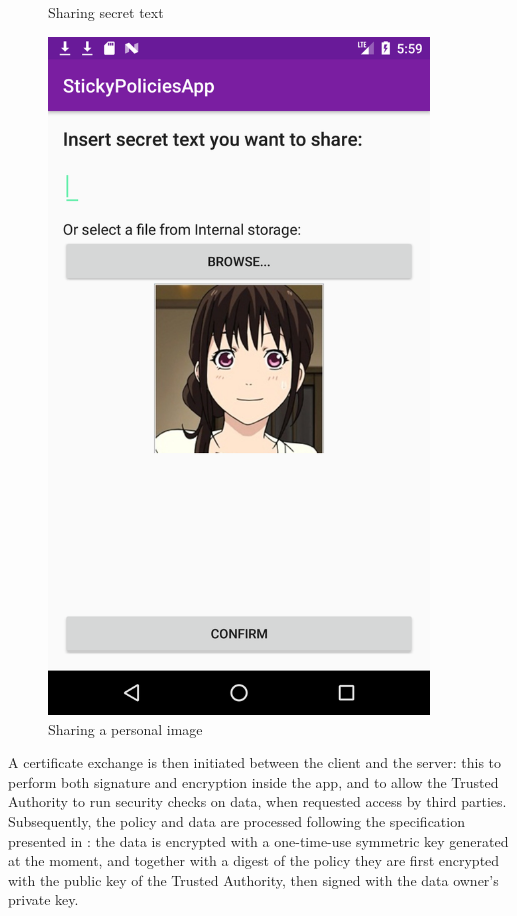 \begin{figure}
\begin{minipage}{0.35\textwidth}
		\caption{Sharing secret text}
		\label{fig:share-text}
	\end{minipage}
	\begin{minipage}{0.35\textwidth}
		\centering
		\includegraphics[width=0.9\textwidth]{ShareData-image.png} %
		\caption{Sharing a personal image}
		\label{fig:share-img}
	\end{minipage}
\end{figure}


A certificate exchange is then initiated between the client and the server: this to perform both signature and encryption inside the app, and to allow the Trusted Authority to run security checks on data, when requested access by third parties. Subsequently, the policy and data are processed following the specification presented in \cite{mont2003towards}: the data is encrypted with a one-time-use symmetric key generated at the moment, and together with a digest of the policy they are first encrypted with the public key of the Trusted Authority, then signed with the data owner's private key.

